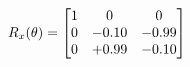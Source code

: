 \documentclass[preview]{standalone}
\begin{document}
\begin{align*}
\special{dvisvgm:raw <g id='unique000'>}R_{x}(\theta) = \begin{bmatrix}1 & 0 & 0 \\0 & -0.10 & -0.99 \\0 & +0.99 & -0.10\end{bmatrix}\special{dvisvgm:raw </g>}
\end{align*}
\end{document}
